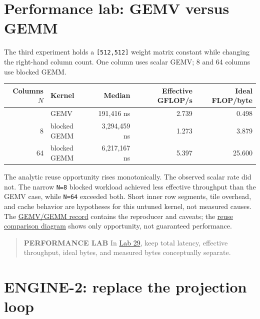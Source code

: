 \section{Performance lab: GEMV versus
GEMM}\label{performance-lab-gemv-versus-gemm}

The third experiment holds a \texttt{{[}512,512{]}} weight matrix
constant while changing the right-hand column count. One column uses
scalar GEMV; 8 and 64 columns use blocked GEMM.

{\def\LTcaptype{none} %
\begin{longtable}[]{@{}rlrrr@{}}
\toprule\noalign{}
Columns \(N\) & Kernel & Median & Effective GFLOP/s & Ideal FLOP/byte \\
\midrule\noalign{}
\endhead
\bottomrule\noalign{}
\endlastfoot
1 & GEMV & 191,416 ns & 2.739 & 0.498 \\
8 & blocked GEMM & 3,294,459 ns & 1.273 & 3.879 \\
64 & blocked GEMM & 6,217,167 ns & 5.397 & 25.600 \\
\end{longtable}
}


The analytic reuse opportunity rises monotonically. The observed scalar
rate did not. The narrow \texttt{N=8} blocked workload achieved less
effective throughput than the GEMV case, while \texttt{N=64} exceeded
both. Short inner row segments, tile overhead, and cache behavior are
hypotheses for this untuned kernel, not measured causes. The
\href{https://github.com/hermonai/inside-the-llm-engine/blob/astra-visual-rewrite/research/benchmarks/chapter-06-gemv-vs-gemm.md}{GEMV/GEMM
record} contains the reproducer and caveats; the
\href{https://github.com/hermonai/inside-the-llm-engine/blob/astra-visual-rewrite/diagrams/linear/gemv-vs-gemm-reuse.txt}{reuse
comparison diagram} shows only opportunity, not guaranteed performance.

\begin{quote}
\textbf{PERFORMANCE LAB} In
\href{https://github.com/hermonai/inside-the-llm-engine/blob/astra-visual-rewrite/labs/lab-29-gemv-vs-gemm.md}{Lab
29}, keep total latency, effective throughput, ideal bytes, and measured
bytes conceptually separate.
\end{quote}

\section{ENGINE-2: replace the projection
loop}\label{engine-2-replace-the-projection-loop}

